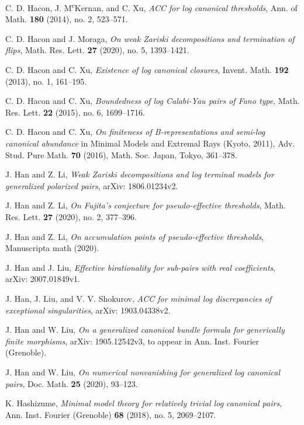 \documentclass[11pt]{amsart}
\numberwithin{equation}{section}
\theoremstyle{definition}
\theoremstyle{definition}
\theoremstyle{definition}
\begin{document}
\begin{thebibliography}{99}
 C. D. Hacon, J. M\textsuperscript{c}Kernan, and C. Xu, \textit{ACC for log canonical thresholds}, Ann. of Math. \textbf{180} (2014), no. 2, 523--571.

 C. D. Hacon and J. Moraga, \textit{On weak Zariski decompositions and termination of flips}, Math. Res. Lett. \textbf{27} (2020), no. 5, 1393--1421.


 C. D. Hacon and C. Xu, \textit{Existence of log canonical closures}, Invent. Math. \textbf{192} (2013), no. 1, 161--195.

 C. D. Hacon and C. Xu, \textit{Boundedness of log Calabi-Yau pairs of Fano type}, Math. Res. Lett. \textbf{22} (2015), no. 6, 1699--1716.

 C. D. Hacon and C. Xu, \textit{On finiteness of B-representations and semi-log canonical abundance} in Minimal Models and Extremal Rays (Kyoto, 2011), Adv. Stud. Pure Math. \textbf{70} (2016), Math. Soc. Japan, Tokyo, 361--378. 

 J. Han and Z. Li, \textit{Weak Zariski decompositions and log terminal models for generalized polarized pairs}, arXiv: 1806.01234v2.

 J. Han and Z. Li, \textit{On Fujita’s conjecture for pseudo-effective thresholds}, Math. Res. Lett. \textbf{27} (2020), no. 2, 377--396.

 J. Han and Z. Li, \textit{On accumulation points of pseudo-effective thresholds}, Manuscripta math (2020).

 J. Han and J. Liu, \textit{Effective birationality for sub-pairs with real coefficients}, arXiv: 2007.01849v1.

 J. Han, J. Liu, and V. V. Shokurov, \textit{ACC for minimal log discrepancies of exceptional singularities}, arXiv: 1903.04338v2.

 J. Han and W. Liu, \textit{On a generalized canonical bundle formula for generically finite morphisms}, arXiv: 1905.12542v3,  to appear in Ann. Inst. Fourier (Grenoble).

 J. Han and W. Liu, \textit{On numerical nonvanishing for generalized log canonical pairs}, Doc. Math. \textbf{25} (2020), 93--123.

 K. Hashizume, \textit{Minimal model theory for relatively trivial log canonical pairs}, Ann. Inst. Fourier (Grenoble) \textbf{68} (2018), no. 5, 2069--2107.


\end{thebibliography}
\end{document}
